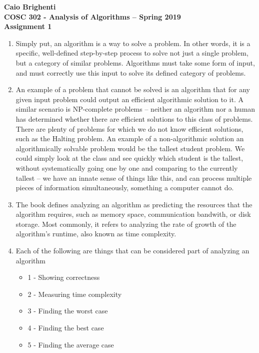 \documentclass{article}
\begin{document}
\noindent \textbf{Caio Brighenti }\\
\noindent \textbf{COSC 302 - Analysis of Algorithms -- Spring 2019}\\%
\noindent \textbf{Assignment 1}\vspace{1em}\\
\begin{enumerate}
	\item 
	Simply put, an algorithm is a way to solve a problem. In other words, it is a specific, well-defined step-by-step process to solve not just a single problem, but a category of similar problems. Algorithms must take some form of input, and must correctly use this input to solve its defined category of problems.
	\item 
	An example of a problem that cannot be solved is an algorithm that for any given input problem could output an efficient algorithmic solution to it. A similar scenario is NP-complete problems -- neither an algorithm nor a human has determined whether there are efficient solutions to this class of problems. There are plenty of problems for which we do not know efficient solutions, such as the Halting problem. An example of a non-algorithmic solution an algorithmically solvable problem would be the tallest student problem. We could simply look at the class and see quickly which student is the tallest, without systematically going one by one and comparing to the currently tallest -- we have an innate sense of things like this, and can process multiple pieces of information simultaneously, something a computer cannot do.
	\item The book defines analyzing an algorithm as predicting the resources that the algorithm requires, such as memory space, communication bandwith, or disk storage. Most commonly, it refers to analyzing the rate of growth of the algorithm's runtime, also known as time complexity.
	\item Each of the following are things that can be considered part of analyzing an algorithm \begin{itemize}
		\item 1 - Showing correctness
		\item 2 - Measuring time complexity
		\item 3 - Finding the worst case
		\item 4 - Finding the best case
		\item 5 - Finding the average case

\end{itemize}
\end{enumerate}
\end{document}
